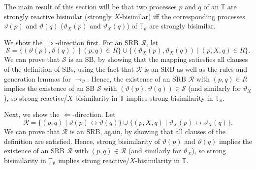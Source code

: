 %
\begin{isabellebody}%
%
%
\isadelimtheory
%
\endisadelimtheory
%
\isatagtheory
%
\endisatagtheory
{\isafoldtheory}%
%
\isadelimtheory
%
\endisadelimtheory
%
\isadelimdocument
%
\endisadelimdocument
%
\isatagdocument
%
\isamarkuptrue%
%
\endisatagdocument
{\isafolddocument}%
%
\isadelimdocument
%
\endisadelimdocument
%
\begin{isamarkuptext}%
\label{sec:reduction_bisimilarity}%
\end{isamarkuptext}\isamarkuptrue%
%
\begin{isamarkuptext}%
The main result of this section will be that two processes $p$ and $q$ of an \LTSt{} $\mathbb{T}$ are strongly reactive bisimilar (strongly $X$-bisimilar) iff the corresponding processes $\vartheta(p)$ and $\vartheta(q)$ ($\vartheta_X(p)$ and $\vartheta_X(q)$) of $\mathbb{T}_\vartheta$ are strongly bisimilar. 

We show the $\Longrightarrow$-direction first. For an SRB $\mathcal{R}$, let
$$\mathcal{S} = \{ (\vartheta(p), \vartheta(q)) \mid (p, q) \in R \} \cup \{ (\vartheta_X(p), \vartheta_X(q)) \mid (p, X, q) \in R \}.$$
We can prove that $\mathcal{S}$ is an SB, by showing that the mapping satiesfies all clauses of the definition of SBs, using the fact that $\mathcal{R}$ is an SRB as well as the rules and generation lemmas for $\rightarrow_\vartheta$. Hence, the existence of an SRB $\mathcal{R}$ with $(p, q) \in R$ implies the existence of an SB $\mathcal{S}$ with $(\vartheta(p), \vartheta(q)) \in \mathcal{S}$ (and similarly for $\vartheta_X$), so strong reactive/$X$-bisimilarity in $\mathbb{T}$ implies strong bisimilarity in $\mathbb{T}_\vartheta$.

Next, we show the $\Longleftarrow$-direction. Let
$$\mathcal{R} = \{ (p, q) \mid \vartheta(p) \leftrightarrow \vartheta(q) \} \cup \{ (p, X, q) \mid \vartheta_X(p) \leftrightarrow \vartheta_X(q) \}.$$
We can prove that $\mathcal{R}$ is an SRB, again, by showing that all clauses of the definition are satisfied. Hence, strong bisimilarity of $\vartheta(p)$ and $\vartheta(q)$ implies the existence of an SRB $\mathcal{R}$ with $(p, q) \in \mathcal{R}$ (and similarly for $\vartheta_X$), so strong bisimilarity in $\mathbb{T}_\vartheta$ implies strong reactive/$X$-bisimilarity in $\mathbb{T}$.


\end{isamarkuptext}
\end{isabellebody}
